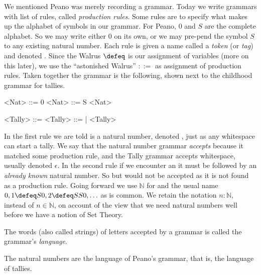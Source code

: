\index{\code{::=}}
We mentioned Peano was merely recording a grammar.  Today we write grammars with
list of rules, called \emph{production rules}.  Some rules are to specify what
makes up the alphabet of symbols in our grammar.  For Peano, $0$ and $S$ are the
complete alphabet.  So we may write either $0$ on its own, or we may pre-pend
the symbol $S$ to any existing natural number.  Each rule is given a name called
a \emph{token} (or \emph{tag}) and denoted . Since the Walrus
$\defeq$ is our assignment of variables (more on this later), we use the
``astonished Walrus'' $::=$ as assignment of production rules.   Taken together
the grammar is the following, shown next to the childhood grammar for tallies.
\begin{center}
\begin{minipage}{0.4\textwidth}
\begin{Gcode}[]
<Nat> ::= 0 
<Nat> ::= S <Nat>
\end{Gcode}
\end{minipage}
\hfill
\begin{minipage}{0.45\textwidth}
\begin{Gcode}[]
<Tally> ::=  
<Tally> ::= | <Tally>
\end{Gcode}
\end{minipage}
\end{center}
In the first rule we are told  is a natural number, denoted
, just as any whitespace can start a tally. We say that the natural
number grammar \emph{accepts}  because it matched some production rule,
and the Tally grammar accepts whitespace, usually denoted $\epsilon$.  In the
second rule if we encounter an  it must be followed by an \emph{already
known} natural number.  So  but  would not be accepted as
it is not found as a production rule.  Going forward we use $\mathbb{N}$ 
for  and the usual name $0,1\defeq S0, 2\defeq SS0,\ldots$ as is common.
We retain the notation $n:\mathbb{N}$, instead of $n\in \mathbb{N}$, on account 
of the view that we need natural numbers well before we have a notion of Set Theory.

\begin{definition}
    The words (also called strings) of letters accepted by a grammar is called
    the grammar's \emph{language}.
\end{definition}

\begin{example}
The natural numbers are the language of Peano's grammar, that is, the language of tallies.
\end{example}

